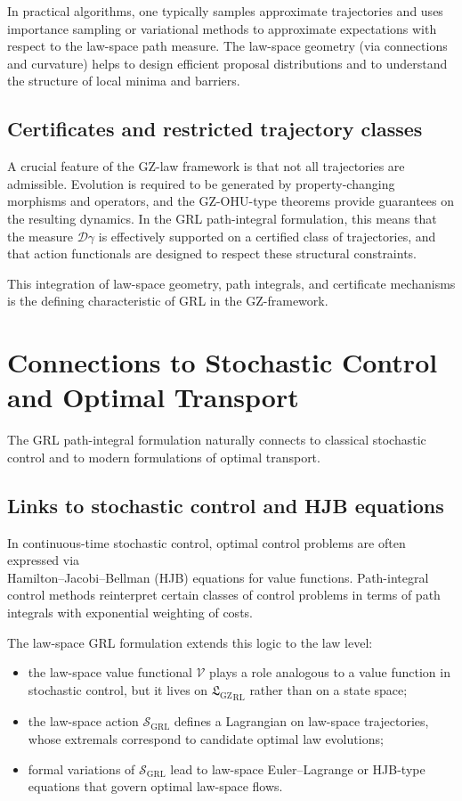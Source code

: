 \documentclass[11pt]{book}
\newcommand{\GZLS}{\ensuremath{\mathfrak{L}_{\mathrm{GZ}}}}
\theoremstyle{plain}
\theoremstyle{definition}
\theoremstyle{remark}
\begin{document}
In practical algorithms, one typically samples approximate
trajectories and uses importance sampling or variational methods to
approximate expectations with respect to the law-space path measure.
The law-space geometry (via connections and curvature) helps to
design efficient proposal distributions and to understand the
structure of local minima and barriers.

\subsection*{Certificates and restricted trajectory classes}

A crucial feature of the GZ-law framework is that not all
trajectories are admissible. Evolution is required to be generated
by property-changing morphisms and operators, and the GZ-OHU-type
theorems provide guarantees on the resulting dynamics. In the GRL
path-integral formulation, this means that the measure $\mathcal{D}\gamma$
is effectively supported on a certified class of trajectories, and
that action functionals are designed to respect these structural
constraints.

This integration of law-space geometry, path integrals, and
certificate mechanisms is the defining characteristic of GRL in the
GZ-framework.

\section{Connections to Stochastic Control and Optimal Transport}
\label{sec:grl-stoch-control-ot}


The GRL path-integral formulation naturally connects to classical
stochastic control and to modern formulations of optimal transport.

\subsection*{Links to stochastic control and HJB equations}

In continuous-time stochastic control, optimal control problems are
often expressed via \\Hamilton--Jacobi--Bellman (HJB) equations for
value functions. Path-integral control methods reinterpret certain
classes of control problems in terms of path integrals with
exponential weighting of costs.

The law-space GRL formulation extends this logic to the law level:
\begin{itemize}
  \item the law-space value functional $\mathcal{V}$ plays a role
        analogous to a value function in stochastic control, but it
        lives on ${\GZLS}_{\mathrm{RL}}$ rather than on a state space;
  \item the law-space action $\mathcal{S}_{\mathrm{GRL}}$ defines a
        Lagrangian on law-space trajectories, whose extremals
        correspond to candidate optimal law evolutions;
  \item formal variations of $\mathcal{S}_{\mathrm{GRL}}$ lead to
        law-space Euler--Lagrange or HJB-type equations that govern
        optimal law-space flows.
\end{itemize}
\end{document}
